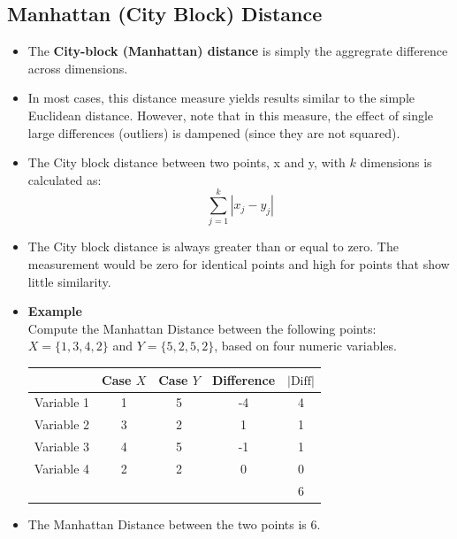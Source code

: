 \documentclass[a4paper,12pt]{report}
\begin{document}
\subsection{Manhattan (City Block) Distance}
\begin{itemize}
\item The \textbf{City-block (Manhattan) distance} is simply the aggregrate difference across dimensions. 
\item In most cases, this distance measure yields results similar to the simple Euclidean distance. However, note that in this measure, the effect of single large differences (outliers) is dampened (since they are not squared). 


\item 
The City block distance between two points, x and y, with $k$ dimensions is calculated as:
\[ \sum^{k}_{j=1} | x_j - y_j |  \]

\item The City block distance is always greater than or equal to zero. The measurement would be zero for identical points and high for points that show little similarity.

\item  \textbf{Example}\\
Compute the Manhattan Distance between the following points: 
$X = \{1,3,4,2\}$ and $Y = \{5,2,5,2\}$, based on four numeric variables.


\begin{center}
	\begin{tabular}{|c|c|c|c|c|}
		\hline
	&	Case $X$	&	Case $Y$	&   Difference	&	$| \mbox{Diff} |$	\\ \hline
Variable 1	&	1	&	5	&	-4	&	4	\\
Variable 2	&	3	&	2	&	1	&	1	\\
Variable 3	&	4	&	5	&	-1	&	1	\\
Variable 4	&	2	&	2	&	0	&	0	\\ \hline
		& & && 6 \\
		\hline
	\end{tabular}
\end{center}
\item The Manhattan Distance between the two points is 6.
\end{itemize}



\newpage
\end{document}
